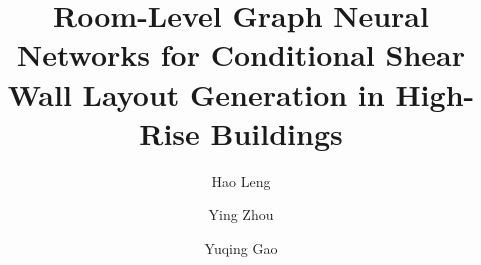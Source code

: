 \documentclass[final,5p,times,twocolumn, fleqn]{elsarticle}
\begin{document}
\setlength{\abovedisplayskip}{5pt}
\setlength{\belowdisplayskip}{5pt}

\begin{frontmatter}



\title{Room-Level Graph Neural Networks for Conditional Shear Wall Layout Generation in High-Rise Buildings}


\author{Hao Leng}
\author{Ying Zhou}
\author{Yuqing Gao}

\address{State Key Laboratory of Disaster Reduction in Civil Engineering, Tongji University, Shanghai 200092, China}




\end{frontmatter}
\end{document}
